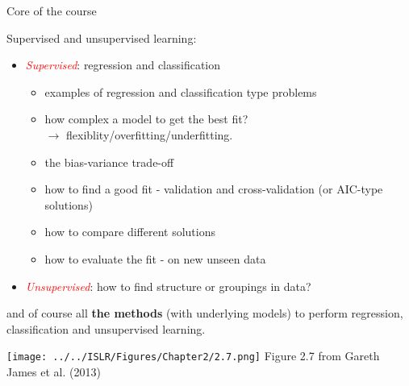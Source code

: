 \documentclass[10pt,ignorenonframetext,]{beamer}
\providecommand{\tightlist}{%
  \setlength{\itemsep}{0pt}\setlength{\parskip}{0pt}}
\begin{document}
\begin{frame}{Core of the course}
\protect\hypertarget{core-of-the-course}{}

Supervised and unsupervised learning:

\begin{itemize}
\tightlist
\item
  \emph{\textcolor{red}{Supervised}}: regression and classification

  \begin{itemize}
  \tightlist
  \item
    examples of regression and classification type problems
  \item
    how complex a model to get the best fit?\\
    \(\rightarrow\) flexiblity/overfitting/underfitting.
  \item
    the bias-variance trade-off
  \item
    how to find a good fit - validation and cross-validation (or
    AIC-type solutions)
  \item
    how to compare different solutions
  \item
    how to evaluate the fit - on new unseen data
  \end{itemize}
\end{itemize}

\vspace{2mm}

\begin{itemize}
\tightlist
\item
  \emph{\textcolor{red}{Unsupervised}}: how to find structure or
  groupings in data?
\end{itemize}

\vspace{2mm}

and of course all \textbf{the methods} (with underlying models) to
perform regression, classification and unsupervised learning.

\end{frame}

\begin{frame}

\centering

\texttt{[image: ../../ISLR/Figures/Chapter2/2.7.png]} Figure 2.7 from
Gareth James et al. (2013)

\end{frame}
\end{document}
